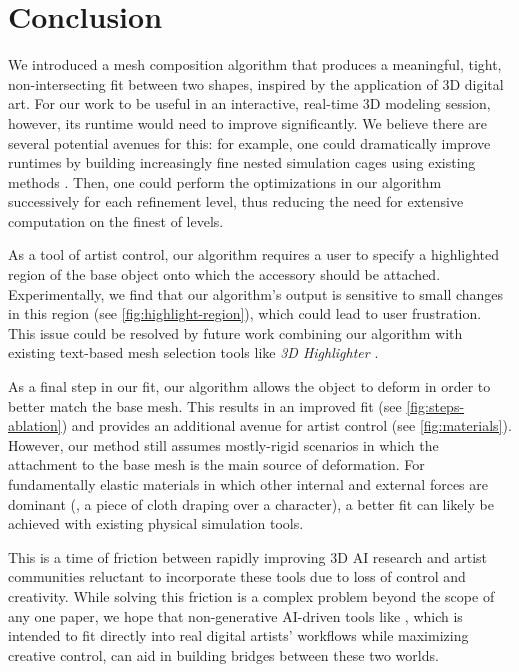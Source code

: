 



  
\section{Conclusion} \label{sec:conclusion}
We introduced a mesh composition algorithm that produces a meaningful, tight, non-intersecting fit between two shapes, inspired by the application of 3D digital art.
For our work to be useful in an interactive, real-time 3D modeling session, however, its runtime would need to improve significantly.
We believe there are several potential avenues for this: for example, one could dramatically improve runtimes by building increasingly fine nested simulation cages using existing methods \cite{sacht2015nested}. Then, one could perform the optimizations in our algorithm successively for each refinement level, thus reducing the need for extensive computation on the finest of levels.

As a tool of artist control, our algorithm requires a user to specify a highlighted region of the base object onto which the accessory should be attached. Experimentally, we find that our algorithm's output is sensitive to small changes in this region (see \autoref{fig:highlight-region}), which could lead to user frustration.
This issue could be resolved by future work combining our algorithm with existing text-based mesh selection tools like \emph{3D Highlighter} \cite{decatur20233d}.




As a final step in our fit, our algorithm allows the object to deform in order to better match the base mesh.
This results in an improved fit (see \autoref{fig:steps-ablation}) and provides an additional avenue for artist control (see \autoref{fig:materials}).
However, our method still assumes mostly-rigid scenarios in which the attachment to the base mesh is the main source of deformation.
For fundamentally elastic materials in which other internal and external forces are dominant (\eg, a piece of cloth draping over a character), a better fit can likely be achieved with existing physical simulation tools.

This is a time of friction between rapidly improving 3D AI research and artist communities reluctant to incorporate these tools due to loss of control and creativity.
While solving this friction is a complex problem beyond the scope of any one paper, we hope that non-generative AI-driven tools like \ourmethod{}, which is intended to fit directly into real digital artists' workflows while maximizing creative control, can aid in building bridges between these two worlds.